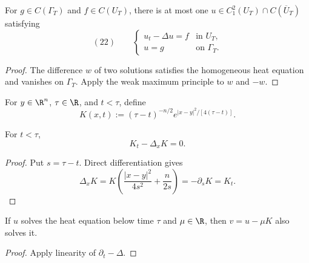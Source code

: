 \begin{theorem}
\label{thm:uniqueness-heat-bounded-domain}
\leanok
For $g\in C(\Gamma_T)$ and $f\in C(U_T)$, there is at most one
$u\in C_1^2(U_T)\cap C(\overline U_T)$ satisfying
$$(22)\qquad
\begin{cases}
u_t-\Delta u=f&\text{in }U_T,\\
u=g&\text{on }\Gamma_T.
\end{cases}$$
\end{theorem}
\begin{proof}
\leanok
\sketch The difference $w$ of two solutions satisfies the homogeneous heat
equation and vanishes on $\Gamma_T$. Apply the weak maximum principle to
$w$ and $-w$.
\end{proof}

\begin{definition}
\label{def:comparison-kernel}
\leanok
{}
For $y\in\R^n$, $\tau\in\R$, and $t<\tau$, define
$$K(x,t):=(\tau-t)^{-n/2}
e^{|x-y|^2/[4(\tau-t)]}.$$
\end{definition}

\begin{lemma}
\label{lem:comparison-kernel-solves-heat}
\leanok
{}
For $t<\tau$,
$$K_t-\Delta_xK=0.$$
\end{lemma}
\begin{proof}
\leanok
\sketch Put $s=\tau-t$. Direct differentiation gives
$$\Delta_xK=K\left(\frac{|x-y|^2}{4s^2}+\frac n{2s}\right)
=-\partial_sK=K_t.$$
\end{proof}

\begin{lemma}
\label{lem:comparison-function-solves-heat}
\leanok
{}
If $u$ solves the heat equation below time $\tau$ and $\mu\in\R$, then
$v=u-\mu K$ also solves it.
\end{lemma}
\begin{proof}
\leanok
\sketch Apply linearity of $\partial_t-\Delta$.
\end{proof}

